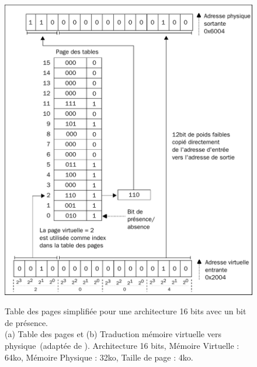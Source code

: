 \documentclass[8pt]{beamer}
\begin{document}
\begin{frame}
\begin{figure}
\begin{minipage}[b]{0.5\linewidth}
            \includegraphics[width=.95\linewidth]{figures/page_mapping.pdf}
            \subcaption{}
            \label{fig:page_mapping}
        \end{minipage}
        \caption{Table des pages simplifiée pour une architecture 16 bits avec
            un bit de
            pr\'esence. \\ (a) Table des pages et (b) Traduction mémoire
            virtuelle vers physique~(adaptée de \cite{tanenbaum2009modern}).
            Architecture 16 bits,
            Mémoire Virtuelle : 64ko, Mémoire Physique : 32ko,
            Taille de page : 4ko. \\
        }
    \end{figure}

\end{frame}
\end{document}
